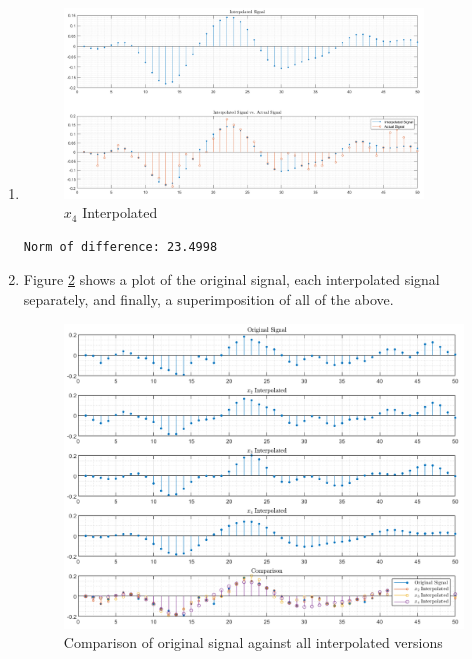 \documentclass{article}[a4paper]
\begin{document}
\begin{enumerate}[label=(\alph*)]
		\item \phantom{a}
		\begin{figure}[H]
			\centering
			\includegraphics[width=0.9\textwidth]{images/q2_x4_interp.png}
			\caption{$x_4$ Interpolated}
			\label{x4_interp}
		\end{figure}
		
		\begin{lstlisting}[caption={Code output, $\rVert x_4 - x \lVert$}, label=x4_x_norm]
Norm of difference: 23.4998
		\end{lstlisting}
		
		\item Figure \ref{all_compare} shows a plot of the original signal, each interpolated signal separately, and finally, a superimposition of all of the above.
		
		\begin{figure}[H]
			\centering
			\includegraphics[width=\linewidth]{images/q2_all_compare.png}
			\caption{Comparison of original signal against all interpolated versions}
			\label{all_compare}
		\end{figure}
		

\end{enumerate}
\end{document}
